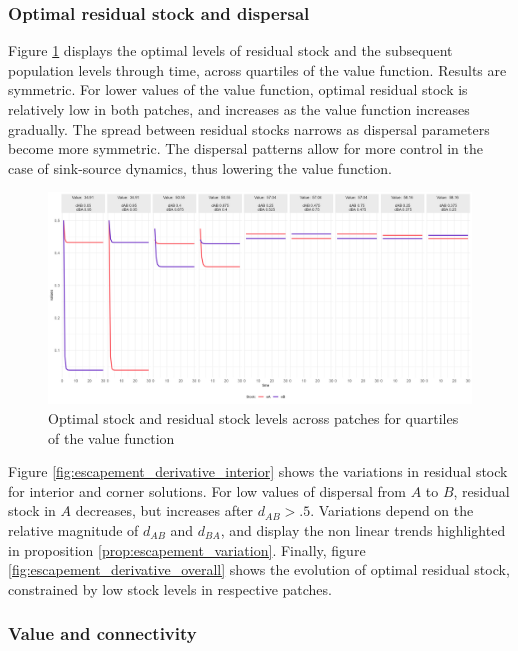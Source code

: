 \subsubsection{Optimal residual stock and dispersal}

Figure \ref{fig:figure1} displays the optimal levels of residual stock and the subsequent population levels through time, across quartiles of the value function. Results are symmetric. For lower values of the value function, optimal residual stock is relatively low in both patches, and increases as the value function increases gradually. The spread between residual stocks narrows as dispersal parameters become more symmetric. The dispersal patterns allow for more control in the case of sink-source dynamics, thus lowering the value function. 

\begin{figure}[H]
        \centering
        \includegraphics[width=\textwidth]{figures/fences/escapement_Baseline.jpg}
        \caption{Optimal stock and residual stock levels across patches for quartiles of the value function}
        \label{fig:figure1}
\end{figure}

Figure \ref{fig:escapement_derivative_interior} shows the variations in residual stock for interior and corner solutions. For low values of dispersal from $A$ to $B$, residual stock in $A$ decreases, but increases after $d_{AB}>.5$. Variations depend on the relative magnitude of $d_{AB}$ and $d_{BA}$, and display the non linear trends highlighted in proposition \ref{prop:escapement_variation}. Finally, figure \ref{fig:escapement_derivative_overall} shows the evolution of optimal residual stock, constrained by low stock levels in respective patches. 


\subsubsection{Value and connectivity}

